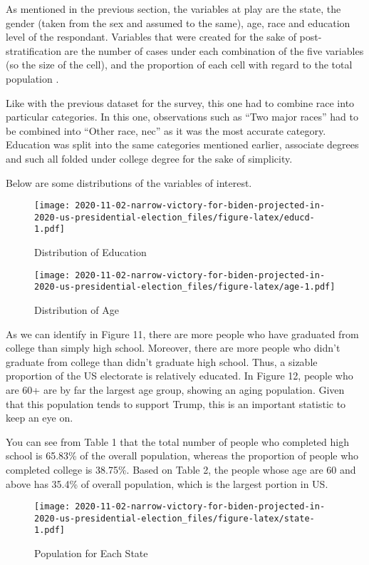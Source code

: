 \documentclass[
]{article}
\begin{document}
As mentioned in the previous section, the variables at play are the state, the gender (taken from the sex and assumed to the same), age, race and education level of the respondant. Variables that were created for the sake of post-stratification are the number of cases under each combination of the five variables (so the size of the cell), and the proportion of each cell with regard to the total population \citep{citeACS}.

Like with the previous dataset for the survey, this one had to combine race into particular categories. In this one, observations such as ``Two major races'' had to be combined into ``Other race, nec'' as it was the most accurate category. Education was split into the same categories mentioned earlier, associate degrees and such all folded under college degree for the sake of simplicity.

Below are some distributions of the variables of interest.

\begin{figure}
\centering
\texttt{[image: 2020-11-02-narrow-victory-for-biden-projected-in-2020-us-presidential-election\_files/figure-latex/educd-1.pdf]}
\caption{\label{fig:educd}Distribution of Education}
\end{figure}

\begin{figure}
\centering
\texttt{[image: 2020-11-02-narrow-victory-for-biden-projected-in-2020-us-presidential-election\_files/figure-latex/age-1.pdf]}
\caption{\label{fig:age}Distribution of Age}
\end{figure}

As we can identify in Figure 11, there are more people who have graduated from college than simply high school. Moreover, there are more people who didn't graduate from college than didn't graduate high school. Thus, a sizable proportion of the US electorate is relatively educated. In Figure 12, people who are 60+ are by far the largest age group, showing an aging population. Given that this population tends to support Trump, this is an important statistic to keep an eye on.

You can see from Table 1 that the total number of people who completed high school is 65.83\% of the overall population, whereas the proportion of people who completed college is 38.75\%. Based on Table 2, the people whose age are 60 and above has 35.4\% of overall population, which is the largest portion in US.

\begin{figure}
\centering
\texttt{[image: 2020-11-02-narrow-victory-for-biden-projected-in-2020-us-presidential-election\_files/figure-latex/state-1.pdf]}
\caption{\label{fig:state}Population for Each State}
\end{figure}
\end{document}
